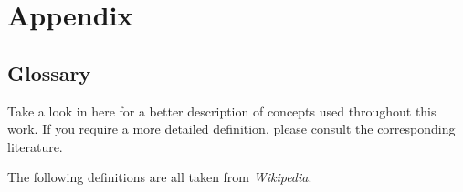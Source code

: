 \chapter{Appendix}

\section{Glossary}\label{glos}
Take a look in here for a better description of concepts used throughout this work. If you require a more detailed definition, please consult the corresponding literature.

The following definitions are all taken from \textit{Wikipedia}.

